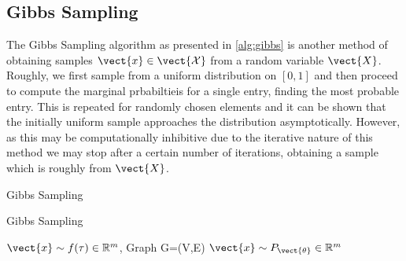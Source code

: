 \subsection{Gibbs Sampling}
The Gibbs Sampling algorithm as presented in \alg\ref{alg:gibbs} is another method of obtaining samples $\vect{x} \in \vect{\mathcal{X}}$ from a random variable $\vect{X}$. 
Roughly, we first sample from a uniform distribution on $[0,1]$ and then proceed to compute the marginal prbabiltieis for a single entry, finding the most probable entry.
This is repeated for randomly chosen elements and it can be shown that the initially uniform sample approaches the distribution asymptotically.
However, as this may be computationally inhibitive due to the iterative nature of this method we may stop after a certain number of iterations, obtaining a sample which is roughly from $\vect{X}$.

\begin{algo}{Gibbs Sampling~\cite{yildirim2012bayesian}}
    \begin{algorithm}[H]
        \caption{Gibbs Sampling}
        \begin{algorithmic}
            \label{alg:gibbs}
            \REQUIRE $\vect{x} \sim f(\tau) \in \mathbb{R}^m$, Graph G=(V,E)
            \ENSURE  $\vect{x} \sim P_{\vect{\theta}}\in \mathbb{R}^m$ \\
                \ENDFOR
            \ENDFOR
        \end{algorithmic}
    \end{algorithm}
\end{algo}
